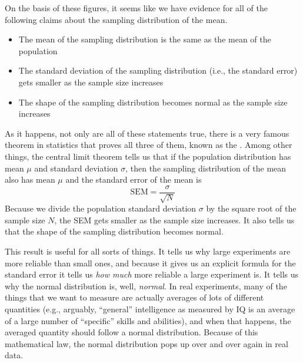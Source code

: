 On the basis of these figures, it seems like we have evidence for all of the following claims about the sampling distribution of the mean.
\begin{itemize} \itemsep -2pt
\item The mean of the sampling distribution is the same as the mean of the population
\item The standard deviation of the sampling distribution (i.e., the standard error) gets smaller as the sample size increases
\item The shape of the sampling distribution becomes normal as the sample size increases
\end{itemize}
As it happens, not only are all of these statements true, there is a very famous theorem in statistics that proves all three of them, known as the . Among other things, the central limit theorem tells us that if the population distribution has mean $\mu$ and standard deviation $\sigma$, then the sampling distribution of the mean also has mean $\mu$ and the standard error of the mean is 
$$
\mbox{SEM} = \frac{\sigma}{ \sqrt{N} }
$$ 
Because we divide the population standard deviation $\sigma$ by the square root of the sample size $N$, the SEM gets smaller as the sample size increases. It also tells us that the shape of the sampling distribution becomes normal. 

This result is useful for all sorts of things. It tells us why large experiments are more reliable than small ones, and because it gives us an explicit formula for the standard error it tells us {\it how much} more reliable a large experiment is. It tells us why the normal distribution is, well, {\it normal}. In real experiments, many of the things that we want to measure are actually averages of lots of different quantities (e.g., arguably, ``general'' intelligence as measured by IQ is an average of a large number of ``specific'' skills and abilities), and when that happens, the averaged quantity should follow a normal distribution. Because of this mathematical law, the normal distribution pops up over and over again in real data. 


